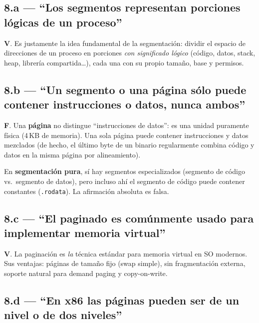 \documentclass[11pt,a4paper]{article}
\begin{document}
\subsection*{8.a --- ``Los segmentos representan porciones lógicas de un proceso''}

\begin{respuesta}
\textbf{V}. Es justamente la idea fundamental de la segmentación:
dividir el espacio de direcciones de un proceso en porciones
\emph{con significado lógico} (código, datos, stack, heap, librería
compartida\ldots), cada una con su propio tamaño, base y permisos.
\end{respuesta}

\subsection*{8.b --- ``Un segmento o una página sólo puede contener instrucciones o datos, nunca ambos''}

\begin{respuesta}
\textbf{F}. Una \textbf{página} no distingue ``instrucciones de
datos'': es una unidad puramente física (4\,KB de memoria). Una sola
página puede contener instrucciones y datos mezclados (de hecho, el
último byte de un binario regularmente combina código y datos en
la misma página por alineamiento).

En \textbf{segmentación pura}, sí hay segmentos especializados
(segmento de código vs.\ segmento de datos), pero incluso ahí el
segmento de código puede contener constantes (\texttt{.rodata}). La
afirmación absoluta es falsa.
\end{respuesta}

\subsection*{8.c --- ``El paginado es comúnmente usado para implementar memoria virtual''}

\begin{respuesta}
\textbf{V}. La paginación es \emph{la} técnica estándar para
memoria virtual en SO modernos. Sus ventajas: páginas de tamaño
fijo (swap simple), sin fragmentación externa, soporte natural para
demand paging y copy-on-write.
\end{respuesta}

\subsection*{8.d --- ``En x86 las páginas pueden ser de un nivel o de dos niveles''}
\end{document}
